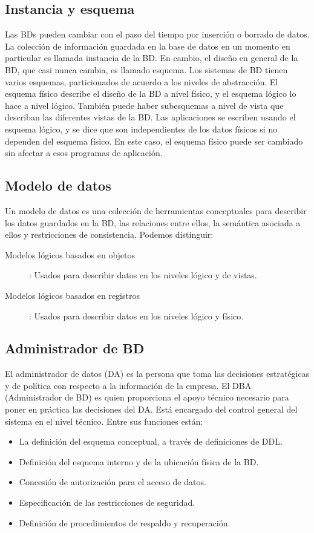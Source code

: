 \documentclass[a4paper]{article}
\begin{document}
\subsection{Instancia y esquema}
Las BDs pueden cambiar con el paso del tiempo por inserción o borrado de datos. La colección de
información guardada en la base de datos en un momento en particular es llamada instancia de la
BD. En cambio, el diseño en general de la BD, que casi nunca cambia, es llamado esquema. Los
sistemas de BD tienen varios esquemas, particionados de acuerdo a los niveles de abstracción.
El esquema físico describe el diseño de la BD a nivel físico, y el esquema lógico lo hace a nivel
lógico. También puede haber subesquemas a nivel de vista que describan las diferentes vistas de
la BD. Las aplicaciones se escriben usando el esquema lógico, y se dice que son independientes de
los datos físicos si no dependen del esquema físico. En este caso, el esquema físico puede ser
cambiado sin afectar a esos programas de aplicación.

\subsection{Modelo de datos}
Un modelo de datos es una colección de herramientas conceptuales para describir los datos guardados
en la BD, las relaciones entre ellos, la semántica asociada a ellos y restricciones de consistencia.
Podemos distinguir:
\begin{description}
    \item[Modelos lógicos basados en objetos]: Usados para describir datos en los niveles lógico y
    de vistas.
    \item[Modelos lógicos basados en registros]: Usados para describir datos en los niveles lógico
    y físico.
\end{description}

\subsection{Administrador de BD}
El administrador de datos (DA) es la persona que toma las decisiones estratégicas y de política con
respecto a la información de la empresa. El DBA (Administrador de BD) es quien proporciona el apoyo
técnico necesario para poner en práctica las decisiones del DA. Está encargado del control general
del sistema en el nivel técnico. Entre sus funciones están:
\begin{itemize}
    \item La definición del esquema conceptual, a través de definiciones de DDL.
    \item Definición del esquema interno y de la ubicación física de la BD.
    \item Concesión de autorización para el acceso de datos.
    \item Especificación de las restricciones de seguridad.
    \item Definición de procedimientos de respaldo y recuperación.
\end{itemize}
\end{document}
